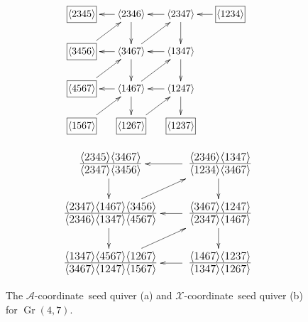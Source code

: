 \documentclass[11pt]{article}
\DeclareMathOperator{\Gr}{Gr}
\def\ket#1{\langle #1 \rangle}
\def\xcoord{$\mathcal{X}$-coordinate}
\def\acoord{$\mathcal{A}$-coordinate}
\begin{document}
\begin{figure}
\centering
\begin{subfigure}[b]{0.45\textwidth}
\begin{equation*}
\begin{gathered}
\begin{xy} 0;<-.5pt,0pt>:<0pt,-.5pt>::
         (-100,0) *+{\framebox[7ex]{$\ket{1234}$}} ="0",
	(0,0) *+{\ket{2347}} ="1",
	(100,0) *+{\ket{2346}} ="2",
	(200,0) *+{\framebox[7ex]{$\ket{2345}$}} ="3",
	(0,75) *+{\ket{1347}} ="4",
	(100,75) *+{\ket{3467}} ="5",
	(200,75) *+{\framebox[7ex]{$\ket{3456}$}} ="6",
	(0,150) *+{\ket{1247}} ="7",
	(100,150) *+{\ket{1467}} ="8",
	(200,150) *+{\framebox[7ex]{$\ket{4567}$}} ="9",
	(0,225) *+{\framebox[7ex]{$\ket{1237}$}} ="10",
	(100,225) *+{\framebox[7ex]{$\ket{1267}$}} ="11",
	(200,225) *+{\framebox[7ex]{$\ket{1567}$}} ="12",
	"0", {\ar"1"},
	"1", {\ar"2"},
	"2", {\ar"3"},
	"4", {\ar"5"},
	"5", {\ar"6"},
	"7", {\ar"8"},
	"8", {\ar"9"},
	"1", {\ar"4"},
	"2", {\ar"5"},
	"4", {\ar"7"},
	"5", {\ar"8"},
	"7", {\ar"10"},
	"8", {\ar"11"},
	"5", {\ar"1"},
	"6", {\ar"2"},
	"8", {\ar"4"},
	"9", {\ar"5"},
	"11", {\ar"7"},
	"12", {\ar"8"},
\end{xy}
\end{gathered} 
\end{equation*} 
\caption{} \label{fig:g47-a-seed}
\end{subfigure}
\hspace*{\fill} 
\begin{subfigure}[b]{0.45\textwidth}
\begin{equation*}
\begin{gathered}
\begin{xy} 0;<-.5pt,0pt>:<0pt,-.5pt>::
	(0,0) *+\txt{\fontsize{16pt}{16pt} $\frac{\ket{2346}\ket{1347}}{\ket{1234}\ket{3467}}$} ="1",
	(220,0) *+\txt{\fontsize{16pt}{16pt} $\frac{\ket{2345}\ket{3467}}{\ket{2347}\ket{3456}}$} ="2",
	(0,100) *+\txt{\fontsize{16pt}{16pt} $\frac{\ket{3467}\ket{1247}}{\ket{2347}\ket{1467}}$} ="4",
	(220,100) *+\txt{\fontsize{16pt}{16pt} $\frac{\ket{2347}\ket{1467}\ket{3456}}{\ket{2346}\ket{1347}\ket{4567}}$} ="5",
	(0,200) *+\txt{\fontsize{16pt}{16pt} $\frac{\ket{1467}\ket{1237}}{\ket{1347}\ket{1267}}$} ="7",
	(220,200) *+\txt{\fontsize{16pt}{16pt} $\frac{\ket{1347}\ket{4567}\ket{1267}}{\ket{3467}\ket{1247}\ket{1567}}$} ="8",
	"1", {\ar"2"},
	"4", {\ar"5"},
	"7", {\ar"8"},
	"1", {\ar"4"},
	"2", {\ar"5"},
	"4", {\ar"7"},
	"5", {\ar"8"},
	"5", {\ar"1"},
	"8", {\ar"4"},
\end{xy}
\end{gathered} 
\end{equation*} 
\caption{} \label{fig:g47-x-seed}
\end{subfigure}
\caption{The \acoord\ seed quiver (a) and \xcoord\ seed quiver (b) for $\Gr(4,7)$.} 
\label{fig:g47-seed}
\end{figure}
\end{document}

